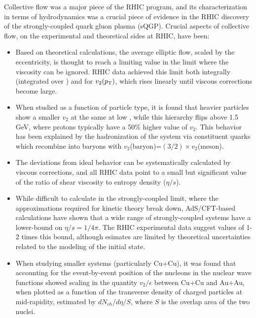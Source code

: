 Collective flow was a major piece of the RHIC program, and its characterization
in terms of hydrodynamics was a crucial piece of evidence in the RHIC discovery
of the strongly-coupled quark gluon plasma (sQGP).  Crucial aspects of collective
flow, on the experimental and theoretical sides at RHIC, have been:
\begin{itemize}
\item Based on theoretical calculations, the average elliptic flow, scaled by the eccentricity, 
is thought to reach a limiting value in the limit where
the viscosity can be ignored.  RHIC data achieved this limit both integrally (integrated over \pT)
and for $v_2(\mbox{$p_{\mathrm{T}}$})$, which rises linearly until viscous corrections become large.
\item When studied as a function of particle type, it is found that heavier particles show
a smaller $v_2$ at the same \pT at low \pT, while this hierarchy flips above 1.5 GeV, where protons
typically have a 50\% higher value of $v_2$.  This behavior has been explained by the hadronization of
the system via constituent quarks which recombine into baryons with $v_2$(baryon)=$(3/2) \times v_2$(meson).
\item The deviations from ideal behavior can be systematically calculated by viscous corrections, and
all RHIC data point to a small but significant value of the ratio of shear viscosity to entropy density ($\eta/s$).
\item While difficult to calculate in the strongly-coupled limit, where the approximations required for kinetic theory break down, AdS/CFT-based calculations have shown that a wide range of strongly-coupled systems have a lower-bound on 
$\eta/s = 1/4\pi$.  The RHIC experimental data suggest values of 1-2 times this bound, although esimates are limited
by theoretical uncertainties related to the modeling of the initial state.
\item When studying smaller systems (particularly Cu+Cu), it was found that accounting for the event-by-event position of the nucleons in the nuclear wave functions showed scaling in the quantity $v_2/\epsilon$ between Cu+Cu and Au+Au, when
plotted as a function of the transverse density of charged particles at mid-rapidity, estimated by $dN_{ch}/d\eta/S$,
where $S$ is the overlap area of the two nuclei.
\end{itemize}

